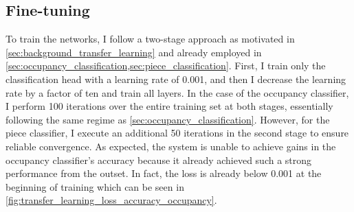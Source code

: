 \documentclass[../report.tex]{subfiles}
\begin{document}
\subsection{Fine-tuning}
\label{sec:transfer_learning_finetuning}
To train the networks, I follow a two-stage approach as motivated in \cref{sec:background_transfer_learning} and already employed in \cref{sec:occupancy_classification,sec:piece_classification}.
First, I train only the classification head with a learning rate of 0.001, and then I decrease the learning rate by a factor of ten and train all layers.
In the case of the occupancy classifier, I perform 100 iterations over the entire training set at both stages, essentially following the same regime as \cref{sec:occupancy_classification}.
However, for the piece classifier, I execute an additional 50 iterations in the second stage to ensure reliable convergence.
As expected, the system is unable to achieve gains in the occupancy classifier's accuracy because it already achieved such a strong performance from the outset.
In fact, the loss is already below 0.001 at the beginning of training which can be seen in \cref{fig:transfer_learning_loss_accuracy_occupancy}.
\end{document}
